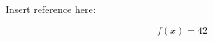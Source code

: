 \documentclass{article}
\begin{document}
Insert reference here:

\begin{equation}
  f(x) = 42
  \label{eq:main-is-working}
\end{equation}






\end{document}
